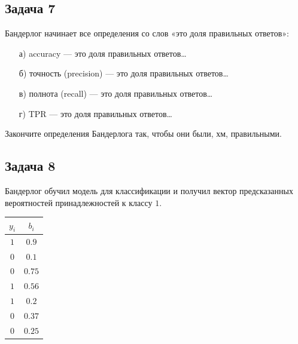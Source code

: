 \documentclass[12pt, a4paper, oneside]{article}
\begin{document}
\subsection*{Задача 7}

Бандерлог начинает все определения со слов «это доля правильных ответов»:
\begin{enumerate}
	\item[а)] accuracy — это доля правильных ответов\ldots
	\item[б)] точность (precision) — это доля правильных ответов\ldots
	\item[в)] полнота (recall) — это доля правильных ответов\ldots
	\item[г)] TPR — это доля правильных ответов\ldots
\end{enumerate}

Закончите определения Бандерлога так, чтобы они были, хм, правильными.



\subsection*{Задача 8}

Бандерлог обучил модель для классификации и получил вектор предсказанных вероятностей принадлежностей к классу $1$. 

\begin{center}
	\begin{tabular}{c|c}
		$y_i$ & $b_i$ \\
		\hline
		$1$  & $0.9$ \\
		$0$ & $0.1$ \\
		$0$ & $0.75$ \\
		$1$ & $0.56$ \\
		$1$ & $0.2$ \\
		$0$ & $0.37$ \\
		$0$ & $0.25$ \\		
	\end{tabular}
\end{center}
\end{document}
